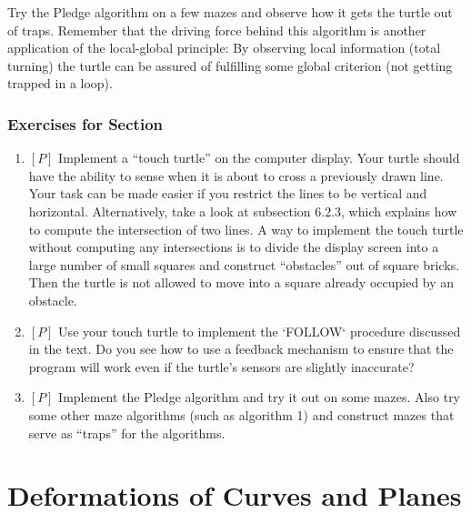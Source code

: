 \documentclass{book}
\begin{document}
Try the Pledge algorithm on a few mazes and observe how it gets the
turtle out of traps. Remember that the driving force behind this algorithm is another application of the local-global principle: By observing
local information (total turning) the turtle can be assured of fulfilling
some global criterion (not getting trapped in a loop).

\subsubsection{Exercises for Section \thesection}

\begin{enumerate}
\item $[P]$ Implement a ``touch turtle'' on the computer display. Your turtle
should have the ability to sense when it is about to cross a previously
drawn line. Your task can be made easier if you restrict the lines to be
vertical and horizontal. Alternatively, take a look at subsection 6.2.3,
which explains how to compute the intersection of two lines. A way
to implement the touch turtle without computing any intersections is
to divide the display screen into a large number of small squares and
construct ``obstacles'' out of square bricks. Then the turtle is not allowed
to move into a square already occupied by an obstacle.
\item $[P]$ Use your touch turtle to implement the \textsc{`FOLLOW`} procedure discussed in the text. Do you see how to use a feedback mechanism to
ensure that the program will work even if the turtle's sensors are slightly
inaccurate?
\item $[P]$ Implement the Pledge algorithm and try it out on some mazes.
Also try some other maze algorithms (such as algorithm 1) and construct
mazes that serve as ``traps'' for the algorithms.
\end{enumerate}

\section{Deformations of Curves and Planes}
\end{document}
